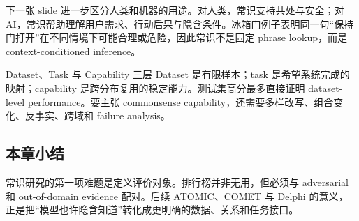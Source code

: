 
下一张 slide 进一步区分人类和机器的用途。对人类，常识支持共处与安全；对 AI，常识帮助理解用户需求、行动后果与隐含条件。冰箱门例子表明同一句“保持门打开”在不同情境下可能合理或危险，因此常识不是固定 phrase lookup，而是 context-conditioned inference。


\begin{importantbox}{Dataset、Task 与 Capability 三层}
Dataset 是有限样本；task 是希望系统完成的映射；capability 是跨分布复用的稳定能力。测试集高分最多直接证明 dataset-level performance。要主张 commonsense capability，还需要多样改写、组合变化、反事实、跨域和 failure analysis。
\end{importantbox}

\subsection{本章小结}

常识研究的第一项难题是定义评价对象。排行榜并非无用，但必须与 adversarial 和 out-of-domain evidence 配对。后续 ATOMIC、COMET 与 Delphi 的意义，正是把“模型也许隐含知道”转化成更明确的数据、关系和任务接口。

